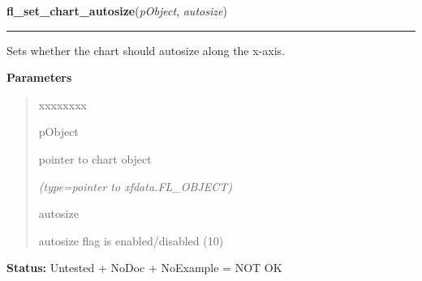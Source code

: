 \hspace{.8\funcindent}\begin{boxedminipage}{\funcwidth}

    \raggedright \textbf{fl\_set\_chart\_autosize}(\textit{pObject}, \textit{autosize})

    \vspace{-1.5ex}

    \rule{\textwidth}{0.5\fboxrule}
\setlength{\parskip}{2ex}
    Sets whether the chart should autosize along the x-axis.

\setlength{\parskip}{1ex}
      \textbf{Parameters}
      \vspace{-1ex}

      \begin{quote}
        \begin{Ventry}{xxxxxxxx}

          \item[pObject]

          pointer to chart object

            {\it (type=pointer to xfdata.FL\_OBJECT)}

          \item[autosize]

          autosize flag is enabled/disabled (1{\textbar}0)

        \end{Ventry}

      \end{quote}

\textbf{Status:} Untested + NoDoc + NoExample = NOT OK



    \end{boxedminipage}

    \label{xformslib:library:fl_set_chart_lstyle}

    \vspace{0.5ex}

